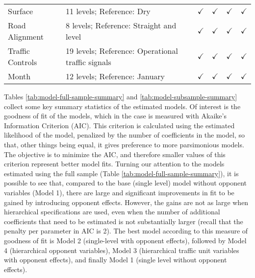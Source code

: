 \documentclass[]{elsarticle} %
\begin{document}
\begin{table}
{\begin{tabular}[t]{llllll}
\hspace{1em}Surface & 11 levels; Reference: Dry & $\checkmark$ & $\checkmark$ & $\checkmark$ & $\checkmark$\\
\rowcolor{gray!6}  \hspace{1em}Road Alignment & 8 levels; Reference: Straight and level & $\checkmark$ & $\checkmark$ & $\checkmark$ & $\checkmark$\\
\hspace{1em}Traffic Controls & 19 levels; Reference: Operational traffic signals & $\checkmark$ & $\checkmark$ & $\checkmark$ & $\checkmark$\\
\rowcolor{gray!6}  \hspace{1em}Month & 12 levels; Reference: January & $\checkmark$ & $\checkmark$ & $\checkmark$ & $\checkmark$\\
\bottomrule
\end{tabular}}
\end{table}

Tables \ref{tab:model-full-sample-summary} and
\ref{tab:model-subsample-summary} collect some key summary statistics of
the estimated models. Of interest is the goodness of fit of the models,
which in the case is measured with Akaike's Information Criterion (AIC).
This criterion is calculated using the estimated likelihood of the
model, penalized by the number of coefficients in the model, so that,
other things being equal, it gives preference to more parsimonious
models. The objective is to minimize the AIC, and therefore smaller
values of this criterion represent better model fits. Turning our
attention to the models estimated using the full sample (Table
\ref{tab:model-full-sample-summary}), it is possible to see that,
compared to the base (single level) model without opponent variables
(Model 1), there are large and significant improvements in fit to be
gained by introducing opponent effects. However, the gains are not as
large when hierarchical specifications are used, even when the number of
additional coefficients that need to be estimated is not substantially
larger (recall that the penalty per parameter in AIC is 2). The best
model according to this measure of goodness of fit is Model 2
(single-level with opponent effects), followed by Model 4 (hierarchical
opponent variables), Model 3 (hierarchical traffic unit variables with
opponent effects), and finally Model 1 (single level without opponent
effects).
\end{document}
